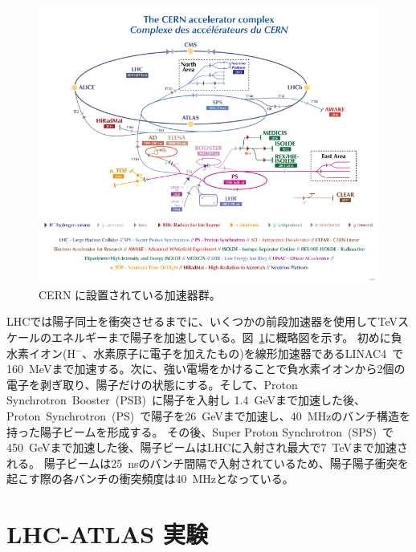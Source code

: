 \begin{figure}[tb]
  \centering
  \includegraphics[clip, width=14cm]{fig/2/CCC-v2022.pdf}
  \caption{CERN に設置されている加速器群\cite{article:accelerator-complex}。}
  \label{fig:LHC加速器}
\end{figure}


LHCでは陽子同士を衝突させるまでに、いくつかの前段加速器を使用してTeVスケールのエネルギーまで陽子を加速している。図~\ref{fig:LHC加速器}に概略図を示す。
初めに負水素イオン(H$^-$、水素原子に電子を加えたもの)を線形加速器であるLINAC4~\cite{article:Linearaccelerator4}で160~MeVまで加速する。次に、強い電場をかけることで負水素イオンから2個の電子を剥ぎ取り、陽子だけの状態にする。そして、Proton Synchrotron~Booster~(PSB)~\cite{article:TheProtonSynchrotronBooster}に陽子を入射し 1.4~GeVまで加速した後、Proton~Synchrotron~(PS)~\cite{article:TheProtonSynchrotron}で陽子を26~GeVまで加速し、40~MHzのバンチ構造を持った陽子ビームを形成する。
その後、Super Proton Synchrotron~(SPS)~\cite{article:TheSuperProtonSynchrotron}で450~GeVまで加速した後、陽子ビームはLHCに入射され最大で7~TeVまで加速される。
陽子ビームは25~nsのバンチ間隔で入射されているため、陽子陽子衝突を起こす際の各バンチの衝突頻度は40~MHzとなっている。



\section{LHC-ATLAS 実験}\label{section2-2}

